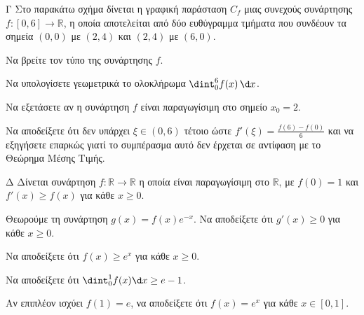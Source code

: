 \begin{thema}{Γ}
Στο παρακάτω σχήμα δίνεται η γραφική παράσταση $C_f$ μιας συνεχούς συνάρτησης $f:[0, 6]\to\mathbb{R}$, η οποία αποτελείται από δύο ευθύγραμμα τμήματα που συνδέουν τα σημεία $(0,0)$ με $(2,4)$ και $(2,4)$ με $(6,0)$. 

\begin{center}
\end{center}

\begin{erwthma}
    \item Να βρείτε τον τύπο της συνάρτησης $f$. 
    \item Να υπολογίσετε γεωμετρικά το ολοκλήρωμα $\dint_0^6 f(x)\,\d x$. 
    \item Να εξετάσετε αν η συνάρτηση $f$ είναι παραγωγίσιμη στο σημείο $x_0=2$. 
    \item Να αποδείξετε ότι δεν υπάρχει $\xi \in (0,6)$ τέτοιο ώστε $f'(\xi) = \frac{f(6)-f(0)}{6}$ και να εξηγήσετε επαρκώς γιατί το συμπέρασμα αυτό δεν έρχεται σε αντίφαση με το Θεώρημα Μέσης Τιμής. 
\end{erwthma}
\end{thema}

\begin{thema}{Δ}
Δίνεται συνάρτηση $f:\mathbb{R}\to\mathbb{R}$ η οποία είναι παραγωγίσιμη στο $\mathbb{R}$, με $f(0)=1$ και $f'(x) \geq f(x)$ για κάθε $x \geq 0$.
\begin{erwthma}
    \item Θεωρούμε τη συνάρτηση $g(x) = f(x)e^{-x}$. Να αποδείξετε ότι $g'(x)\geq 0$ για κάθε $x \geq 0$. 
    \item Να αποδείξετε ότι $f(x)\geq e^x$ για κάθε $x \geq 0$. 
    \item Να αποδείξετε ότι $\dint_0^1 f(x)\d x \geq e-1$. 
    \item Αν επιπλέον ισχύει $f(1)=e$, να αποδείξετε ότι $f(x)=e^x$ για κάθε $x\in[0,1]$. 
\end{erwthma}
\end{thema}

